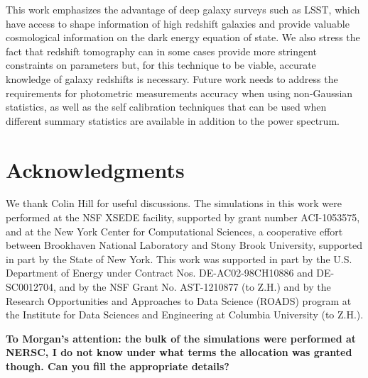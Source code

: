 \documentclass[reprint,aps,prd,superscriptaddress,showkeys,showpacs]{revtex4-1}
\begin{document}
This work emphasizes the advantage of deep galaxy surveys such as LSST, which have access to shape information of high redshift galaxies and provide valuable cosmological information on the dark energy equation of state. We also stress the fact that redshift tomography can in some cases provide more stringent constraints on parameters but, for this technique to be viable, accurate knowledge of galaxy redshifts is necessary. Future work needs to address the requirements for photometric measurements accuracy when using non-Gaussian statistics, as well as the self calibration techniques that can be used when different summary statistics are available in addition to the power spectrum. 


\section*{Acknowledgments}

We thank Colin Hill for useful discussions. The simulations in this work
were performed at the NSF XSEDE facility, supported by grant number
ACI-1053575, and at the New York Center for Computational Sciences, a
cooperative effort between Brookhaven National Laboratory and Stony
Brook University, supported in part by the State of New York. This
work was supported in part by the U.S. Department of Energy under
Contract Nos. DE-AC02-98CH10886 and DE-SC0012704, and by the NSF Grant
No. AST-1210877 (to Z.H.) and by the Research Opportunities and
Approaches to Data Science (ROADS) program at the Institute for Data
Sciences and Engineering at Columbia University (to Z.H.).

\textbf{To Morgan's attention: the bulk of the simulations were performed at NERSC, I do not know under what terms the allocation was granted though. Can you fill the appropriate details?}




\label{lastpage}
\end{document}
